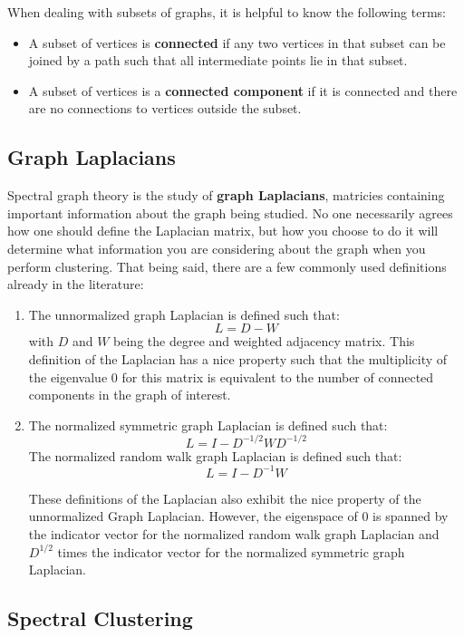 \documentclass{article}
\begin{document}
When dealing with subsets of graphs, it is helpful to know the following terms:
\begin{itemize}
\item A subset of vertices is \textbf{connected} if any two vertices in that subset can be joined by a path such that all intermediate points lie in that subset.
\item A subset of vertices is a \textbf{connected component} if it is connected and there are no connections to vertices outside the subset.
\end{itemize}

\subsection{Graph Laplacians}

Spectral graph theory is the study of \textbf{graph Laplacians}, matricies containing important information about the graph being studied. No one necessarily agrees how one should define the Laplacian matrix, but how you choose to do it will determine what information you are considering about the graph when you perform clustering. That being said, there are a few commonly used definitions already in the literature:
\begin{enumerate}
\item  The unnormalized graph Laplacian is defined such that: $$ L = D - W$$ with $D$ and $W$ being the degree and weighted adjacency matrix. This definition of the Laplacian has a nice property such that the multiplicity of the eigenvalue 0 for this matrix is equivalent to the number of connected components in the graph of interest. 

\item The normalized symmetric graph Laplacian is defined such that: $$ L = I - D^{-1/2}WD^{-1/2}$$
The normalized random walk graph Laplacian is defined such that: $$ L = I - D^{-1}W$$



These definitions of the Laplacian also exhibit the nice property of the unnormalized Graph Laplacian. However, the eigenspace of 0 is spanned by the indicator vector for the normalized random walk graph Laplacian and $D^{1/2}$ times the indicator vector for the normalized symmetric graph Laplacian.

\end{enumerate}

\subsection{Spectral Clustering}
\end{document}
